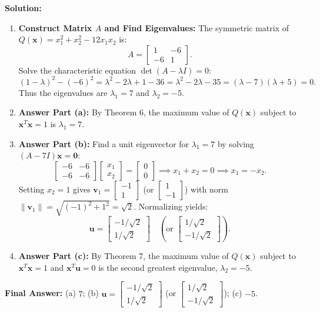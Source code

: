 \documentclass[11pt, letterpaper]{article}
\theoremstyle{definition}
\theoremstyle{remark}
\begin{document}
\textbf{Solution:}
\begin{enumerate}[label=\textbf{Step \arabic*:}]
    \item \textbf{Construct Matrix $A$ and Find Eigenvalues:}
    The symmetric matrix of $Q(\mathbf{x}) = x_1^2 + x_2^2 - 12x_1x_2$ is:
    \[
    A = \begin{bmatrix} 1 & -6 \\ -6 & 1 \end{bmatrix}.
    \]
    Solve the characteristic equation $\det(A - \lambda I) = 0$:
    \[
    (1 - \lambda)^2 - (-6)^2 = \lambda^2 - 2\lambda + 1 - 36 = \lambda^2 - 2\lambda - 35 = (\lambda - 7)(\lambda + 5) = 0.
    \]
    Thus the eigenvalues are $\lambda_1 = 7$ and $\lambda_2 = -5$.
    \item \textbf{Answer Part (a):}
    By Theorem 6, the maximum value of $Q(\mathbf{x})$ subject to $\mathbf{x}^T\mathbf{x} = 1$ is $\lambda_1 = 7$.
    \item \textbf{Answer Part (b):}
    Find a unit eigenvector for $\lambda_1 = 7$ by solving $(A - 7I)\mathbf{x} = \mathbf{0}$:
    \[
    \begin{bmatrix} -6 & -6 \\ -6 & -6 \end{bmatrix} \begin{bmatrix} x_1 \\ x_2 \end{bmatrix} = \begin{bmatrix} 0 \\ 0 \end{bmatrix} \implies x_1 + x_2 = 0 \implies x_1 = -x_2.
    \]
    Setting $x_2 = 1$ gives $\mathbf{v}_1 = \begin{bmatrix} -1 \\ 1 \end{bmatrix}$ (or $\begin{bmatrix} 1 \\ -1 \end{bmatrix}$) with norm $\|\mathbf{v}_1\| = \sqrt{(-1)^2 + 1^2} = \sqrt{2}$. Normalizing yields:
    \[
    \mathbf{u} = \begin{bmatrix} -1/\sqrt{2} \\ 1/\sqrt{2} \end{bmatrix} \quad \left(\text{or } \begin{bmatrix} 1/\sqrt{2} \\ -1/\sqrt{2} \end{bmatrix}\right).
    \]
    \item \textbf{Answer Part (c):}
    By Theorem 7, the maximum value of $Q(\mathbf{x})$ subject to $\mathbf{x}^T\mathbf{x} = 1$ and $\mathbf{x}^T\mathbf{u} = 0$ is the second greatest eigenvalue, $\lambda_2 = -5$.
\end{enumerate}
\textbf{Final Answer:} (a) $7$; \quad (b) $\mathbf{u} = \begin{bmatrix} -1/\sqrt{2} \\ 1/\sqrt{2} \end{bmatrix}$ (or $\begin{bmatrix} 1/\sqrt{2} \\ -1/\sqrt{2} \end{bmatrix}$); \quad (c) $-5$.
\end{document}
